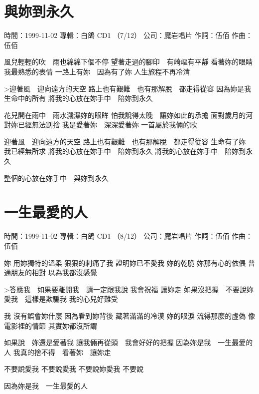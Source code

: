 \documentclass[UTF8,a4paper,oneside,twocolumn,12pt]{ctexbook}
\newcommand{\infopair}[2]{\textbullet #1：#2}
\newcommand{\zc}[1][伍佰]{\infopair{作詞}{#1}}
\newcommand{\zq}[1][伍佰]{\infopair{作曲}{#1}}
\newcommand{\zj}[1]{\infopair{專輯}{#1}}
\newcommand{\sj}[1]{\infopair{時間}{#1}}
\newcommand{\gs}[1]{\infopair{公司}{#1}}
\newenvironment{info}{\begin{flushleft}\kaishu
	}
	{\end{flushleft}\normalsize\yahei\par}
\newenvironment{lyric}{
	}
{}
\begin{document}
\section{與妳到永久}
\begin{info}
	\sj{1999-11-02}
	\zj{白鴿 CD1 （7/12）}
	\gs{魔岩唱片}
	\zc
	\zq
\end{info}
\begin{lyric}
	風兒輕輕的吹　雨也綿綿下個不停
	望著走過的腳印　有崎嶇有平靜
	看著妳的眼睛　我最熟悉的表情
	一路上有妳　因為有了妳
	人生旅程不再冷清

	>迎著風　迎向遠方的天空
	路上也有艱難　也有那解脫　都走得從容
	因為妳是我　生命中的所有
	將我的心放在妳手中　陪妳到永久

	花兒開在雨中　雨水濺濕妳的眼眸
	怕我說得太晚　讓妳如此的承擔
	面對歲月的河　對妳已經無法割捨
	我是愛著妳　深深愛著妳
	一首屬於我倆的歌

	迎著風　迎向遠方的天空
	路上也有艱難　也有那解脫　都走得從容
	生命有了妳　我已經無所求
	將我的心放在妳手中　陪妳到永久
	將我的心放在妳手中　陪妳到永久

	整個的心放在妳手中　與妳到永久
\end{lyric}

\section{一生最愛的人}
\begin{info}
	\sj{1999-11-02}
	\zj{白鴿 CD1 （8/12）}
	\gs{魔岩唱片}
	\zc
	\zq
\end{info}
\begin{lyric}
	妳
	用妳獨特的溫柔
	狠狠的刺痛了我
	證明妳已不愛我
	妳的乾脆
	妳那有心的依偎
	普通朋友的相對
	以為我都沒感覺

	>答應我　如果要離開我　請一定跟我說
	我會祝福  讓妳走
	如果沒把握　不要說妳愛我　這樣是欺騙我
	我的心兒好難受

	我
	沒有誤會妳什麼
	因為看到妳背後
	藏著滿滿的冷漠
	妳的眼淚
	流得那麼的虛偽
	像電影裡的情節
	其實妳都沒所謂

	如果說　妳還是愛著我
	讓我倆再從頭　我會好好的把握
	因為妳是我　一生最愛的人
	我真的捨不得　看著妳　讓妳走

	不要說愛我
	不要說愛我
	不要說妳愛我
	不要說

	因為妳是我　一生最愛的人
\end{lyric}
\end{document}

